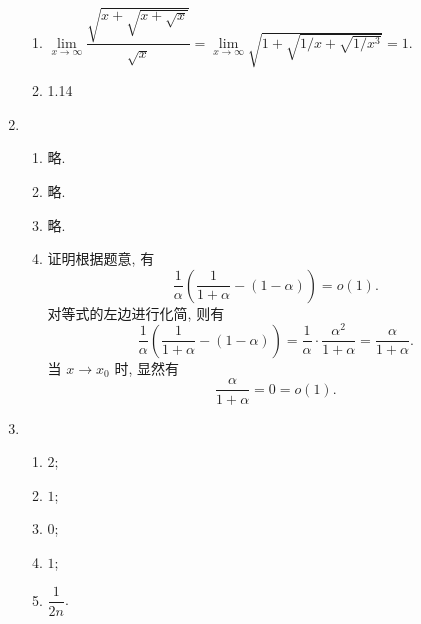 \documentclass[12pt]{ctexart}
\begin{document}
\begin{enumerate}
\begin{enumerate}[(1)]
            \item %
                $\lim\limits_{x\to\infty}\dfrac{\sqrt{x + \sqrt{x + \sqrt{x}}}}{\sqrt{x}} = \lim\limits_{x\to\infty}\sqrt{1 + \sqrt{1/x + \sqrt{1/x^3}}} = 1$.
            \item 1.14
        \end{enumerate}
    \item %
        \begin{enumerate}[(1)]
            \item %
                略.
            \item %
                略.
            \item %
                略.
            \item %
                {\heiti 证明}\quad 根据题意, 有
                \[
                    \frac1\alpha\left(\frac{1}{1+\alpha} - (1-\alpha)\right) = o(1).    
                \]
                对等式的左边进行化简, 则有
                \[
                    \frac1\alpha\left(\frac{1}{1+\alpha} - (1-\alpha)\right) = \frac1\alpha \cdot \frac{\alpha^2}{1+\alpha} = \frac{\alpha}{1 + \alpha}.
                \]
                当 $x \to x_0$ 时, 显然有
                \[
                    \frac{\alpha}{1 + \alpha} = 0 = o(1).  
                \]
        \end{enumerate}
    \item %
        \begin{enumerate}[(1)]
            \item %
                $2$;
            \item %
                $1$;
            \item %
                $0$;
            \item %
                $1$;
            \item %
                $\dfrac{1}{2n}$.
        \end{enumerate}
\end{enumerate}
\end{document}
